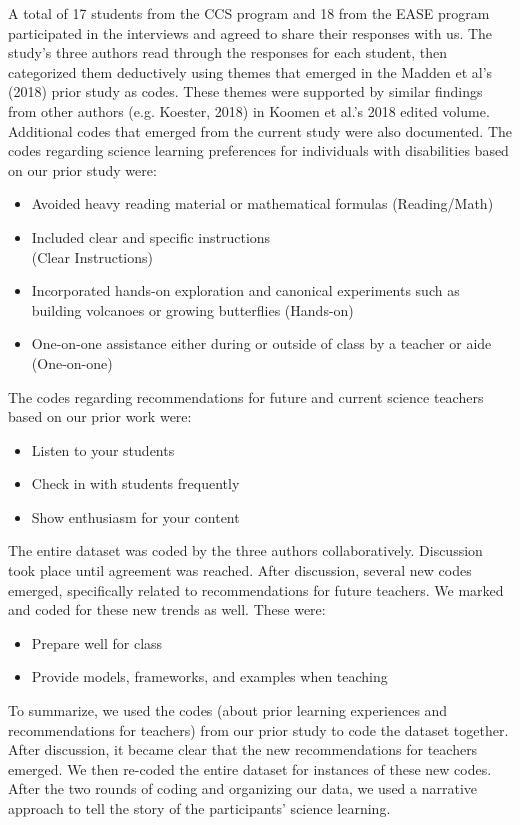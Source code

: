 \documentclass[11pt]{sig-alternate}
\begin{document}
\begin{large}
A total of 17 students from the CCS program and 18 from the EASE program participated in the interviews and agreed to share their responses with us. The study’s three authors read through the responses for each student, then categorized them deductively using themes that emerged in the Madden et al’s (2018) prior study as codes. These themes were supported by similar findings from other authors (e.g. Koester, 2018) in Koomen et al.’s 2018 edited volume. Additional codes that emerged from the current study were also documented. The codes regarding science learning preferences for individuals with disabilities based on our prior study were:

\begin{itemize}
    \item Avoided heavy reading material or mathematical formulas (Reading/Math)
    \item Included clear and specific instructions \\(Clear Instructions)
    \item Incorporated hands-on exploration and can\-onical experiments such as building volcanoes or growing butterflies (Hands-on)
    \item One-on-one assistance either during or outside of class by a teacher or aide (One-on-one)
\end{itemize}

The codes regarding recommendations for future and current science teachers based on our prior work were:
\begin{itemize}
    \item Listen to your students
    \item Check in with students frequently
    \item Show enthusiasm for your content 
\end{itemize}

The entire dataset was coded by the three authors collaboratively. Discussion took place until agreement was reached. After discussion, several new codes emerged, specifically related to recommendations for future teachers. We marked and coded for these new trends as well. These were:
\begin{itemize}
    \item Prepare well for class
    \item Provide models, frameworks, and examples when teaching
\end{itemize}

To summarize, we used the codes (about prior learning experiences and recommendations for teachers) from our prior study to code the dataset together. After discussion, it became clear that the new recommendations for teachers emerged. We then re-coded the entire dataset for instances of these new codes. After the two rounds of coding and organizing our data, we used a narrative approach to tell the story of the participants’ science learning.


\end{large}
\end{document}
